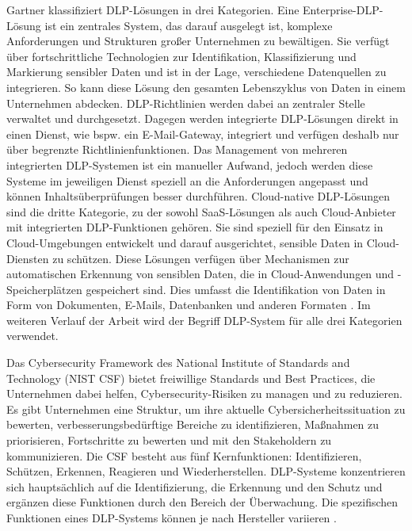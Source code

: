 Gartner klassifiziert DLP-Lösungen in drei Kategorien. Eine Enterprise-DLP-Lösung ist ein zentrales System, das darauf ausgelegt ist, komplexe Anforderungen und Strukturen großer Unternehmen zu bewältigen. Sie verfügt über fortschrittliche Technologien zur Identifikation, Klassifizierung und Markierung sensibler Daten und ist in der Lage, verschiedene Datenquellen zu integrieren. So kann diese Lösung den gesamten Lebenszyklus von Daten in einem Unternehmen abdecken. DLP-Richtlinien werden dabei an zentraler Stelle verwaltet und durchgesetzt.
Dagegen werden integrierte DLP-Lösungen direkt in einen Dienst, wie bspw. ein E-Mail-Gateway, integriert und verfügen deshalb nur über begrenzte Richtlinienfunktionen. Das Management von mehreren integrierten DLP-Systemen ist ein manueller Aufwand, jedoch werden diese Systeme im jeweiligen Dienst speziell an die Anforderungen angepasst und können Inhaltsüberprüfungen besser durchführen.
Cloud-native DLP-Lösungen sind die dritte Kategorie, zu der sowohl SaaS-Lösungen als auch Cloud-Anbieter mit integrierten DLP-Funktionen gehören. Sie sind speziell für den Einsatz in Cloud-Umgebungen entwickelt und darauf ausgerichtet, sensible Daten in Cloud-Diensten zu schützen. Diese Lösungen verfügen über Mechanismen zur automatischen Erkennung von sensiblen Daten, die in Cloud-Anwendungen und -Speicherplätzen gespeichert sind. Dies umfasst die Identifikation von Daten in Form von Dokumenten, E-Mails, Datenbanken und anderen Formaten \cite{Chugh.2023}.
Im weiteren Verlauf der Arbeit wird der Begriff DLP-System für alle drei Kategorien verwendet.

Das Cybersecurity Framework des National Institute of Standards and Technology (NIST CSF) bietet freiwillige Standards und Best Practices, die Unternehmen dabei helfen, Cybersecurity-Risiken zu managen und zu reduzieren. Es gibt Unternehmen eine Struktur, um ihre aktuelle Cybersicherheitssituation zu bewerten, verbesserungsbedürftige Bereiche zu identifizieren, Maßnahmen zu priorisieren, Fortschritte zu bewerten und mit den Stakeholdern zu kommunizieren. Die CSF besteht aus fünf Kernfunktionen: Identifizieren, Schützen, Erkennen, Reagieren und Wiederherstellen.
DLP-Systeme konzentrieren sich hauptsächlich auf die Identifizierung, die Erkennung und den Schutz und ergänzen diese Funktionen durch den Bereich der Überwachung. Die spezifischen Funktionen eines DLP-Systems können je nach Hersteller variieren \cite{NIST.2014}.

